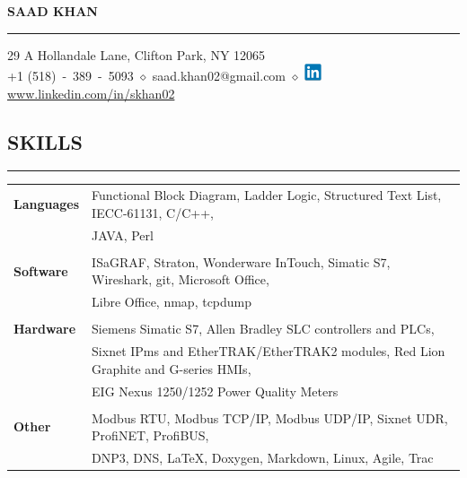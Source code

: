 \documentclass{article}
\begin{document}
%
\begin{center}
    {\MakeUppercase{\huge\bf Saad Khan}} \\
    \bigskip
    \hrule
    \bigskip
    29 A Hollandale Lane, Clifton Park, NY 12065 \\
    +1 (518)~-~389~-~5093
    $\diamond$
    saad.khan02@gmail.com
    $\diamond$
    \href{https://www.linkedin.com/in/skhan02}
         {\includegraphics[width=5mm]{linkedin.png} www.linkedin.com/in/skhan02}
    \\
    \bigskip
\end{center}

%
\subsection*{\MakeUppercase{\bf Skills}}
    \hrule
    \bigskip
    \begin{tabular}{l l}
    {\bfseries Languages} &
    Functional Block Diagram, Ladder Logic, Structured Text List, IECC-61131,
    C/C++,\\
    &
    JAVA, Perl\\
    \\
    {\bfseries Software} &
    ISaGRAF, Straton, Wonderware InTouch, Simatic S7, Wireshark, git,
    Microsoft Office,\\
    &
    Libre Office, nmap, tcpdump \\
    \\
    {\bfseries Hardware} &
    Siemens Simatic S7, Allen Bradley SLC controllers and PLCs,\\
    &
    Sixnet IPms and EtherTRAK/EtherTRAK2 modules, Red Lion Graphite and
    G-series HMIs,\\
    &
    EIG Nexus 1250/1252 Power Quality Meters \\
    \\
    {\bfseries Other} &
    Modbus RTU, Modbus TCP/IP, Modbus UDP/IP, Sixnet UDR, ProfiNET, ProfiBUS,\\
    &
    DNP3, DNS, \LaTeX, Doxygen, Markdown, Linux, Agile, Trac \\
    \end{tabular}
    \bigskip

%
\end{document}
